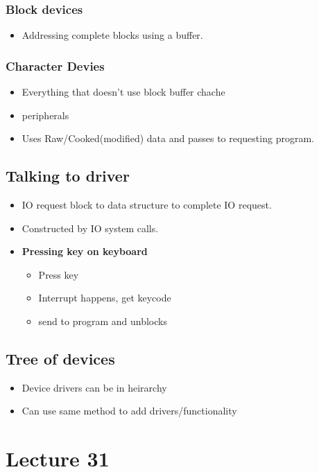 \documentclass{article}
\begin{document}
		\subsubsection{Block devices}	
			\begin{itemize}
				\item Addressing complete blocks using a buffer.
			\end{itemize}
			
		\subsubsection{Character Devies}
			\begin{itemize}
				\item Everything that doesn't use block buffer chache
				\item peripherals
				\item Uses Raw/Cooked(modified) data and passes to requesting program.
			\end{itemize}
	
	\subsection{Talking to driver}
		\begin{itemize}
			\item IO request block to data structure to complete IO request.
			\item Constructed by IO system calls.
			\item \textbf{Pressing key on keyboard}
			\begin{itemize}
				\item Press key
				\item Interrupt happens, get keycode
				\item send to program and unblocks
			\end{itemize}
		\end{itemize}
		
	\subsection{Tree of devices}
		\begin{itemize}
			\item Device drivers can be in heirarchy
			\item Can use same method to add drivers/functionality
		\end{itemize}
		
\section{Lecture 31}
	
\end{document}

